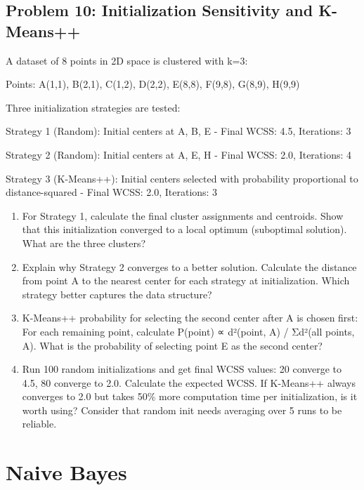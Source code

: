 \documentclass[12pt]{article}
\begin{document}
\subsection*{Problem 10: Initialization Sensitivity and K-Means++}

A dataset of 8 points in 2D space is clustered with k=3:

Points: A(1,1), B(2,1), C(1,2), D(2,2), E(8,8), F(9,8), G(8,9), H(9,9)

Three initialization strategies are tested:

Strategy 1 (Random): Initial centers at A, B, E
- Final WCSS: 4.5, Iterations: 3

Strategy 2 (Random): Initial centers at A, E, H
- Final WCSS: 2.0, Iterations: 4

Strategy 3 (K-Means++): Initial centers selected with probability proportional to distance-squared
- Final WCSS: 2.0, Iterations: 3

\begin{enumerate}[label=(\alph*)]
\item For Strategy 1, calculate the final cluster assignments and centroids. Show that this initialization converged to a local optimum (suboptimal solution). What are the three clusters?

\item Explain why Strategy 2 converges to a better solution. Calculate the distance from point A to the nearest center for each strategy at initialization. Which strategy better captures the data structure?

\item K-Means++ probability for selecting the second center after A is chosen first: For each remaining point, calculate P(point) ∝ d²(point, A) / Σd²(all points, A). What is the probability of selecting point E as the second center?

\item Run 100 random initializations and get final WCSS values: 20 converge to 4.5, 80 converge to 2.0. Calculate the expected WCSS. If K-Means++ always converges to 2.0 but takes 50\% more computation time per initialization, is it worth using? Consider that random init needs averaging over 5 runs to be reliable.
\end{enumerate}


\section{Naive Bayes}
\end{document}
